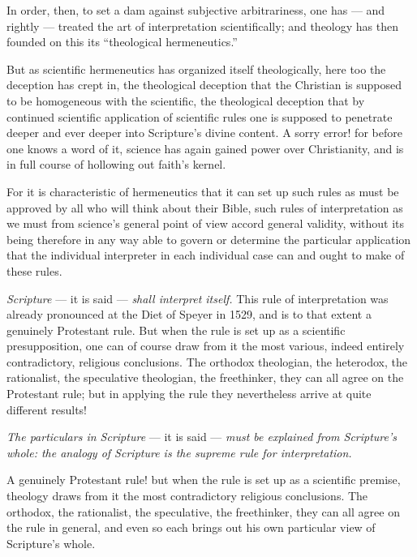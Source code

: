 \documentclass[12pt,a4paper]{book}
\begin{document}
In order, then, to set a dam against subjective arbitrariness, one has --- and
rightly --- treated the art of interpretation scientifically; and theology has then
founded on this its ``theological hermeneutics.''

But as scientific hermeneutics has organized itself theologically, here too the
deception has crept in, the theological deception that the Christian is supposed to
be homogeneous with the scientific, the theological deception that by continued
scientific
application of scientific rules one is supposed to penetrate deeper and ever deeper
into Scripture's divine content. A sorry error! for before one knows a word of it,
science has again gained power over Christianity, and is in full course of hollowing
out faith's kernel.

For it is characteristic of hermeneutics that it can set up such rules as must be
approved by all who will think about their Bible, such rules of interpretation as we
must from science's general point of view accord general validity, without its being
therefore in any way able to govern or determine the particular application that the
individual interpreter in each individual case can and ought to make of these rules.

\emph{Scripture} --- it is said --- \emph{shall interpret itself.} This rule of
interpretation was already pronounced at the Diet of Speyer in 1529, and is to that
extent a genuinely Protestant rule. But when the rule is set up as a scientific
presupposition, one can of course draw from it the most various, indeed entirely
contradictory, religious conclusions. The orthodox theologian, the heterodox, the
rationalist, the speculative theologian, the freethinker, they can all agree on the
Protestant rule; but in applying the rule they nevertheless arrive at quite
different results!

\emph{The particulars in Scripture} --- it is said --- \emph{must be explained from
Scripture's whole: the analogy of Scripture is the supreme rule for interpretation.}

A genuinely Protestant rule! but when the rule is set up as a scientific premise,
theology draws from it the most contradictory religious conclusions. The orthodox,
the rationalist, the speculative, the freethinker, they can all agree on the rule in
general, and even so each brings out his own particular view of Scripture's whole.
\end{document}
